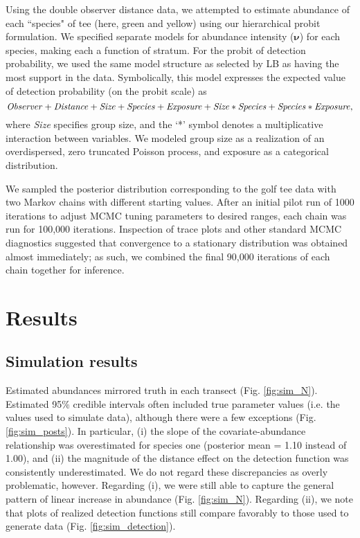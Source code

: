 \documentclass[10pt]{article}
\begin{document}
Using the double observer distance data, we attempted to estimate abundance of each ``species" of tee (here, green and yellow) using our hierarchical probit formulation.  We specified separate models for abundance intensity ($\boldsymbol{\nu}$) for each species, making each a function of stratum. For the probit of detection probability, we used the same model structure as selected by LB as having the most support in the data.  Symbolically, this model expresses the expected value of detection probability (on the probit scale) as
$$
{\it Observer+Distance+Size+Species+Exposure+Size*Species+Species*Exposure},
$$
where {\it Size} specifies group size, and the `*' symbol denotes a multiplicative interaction between variables.  We modeled group size as a realization of an overdispersed, zero truncated Poisson process, and exposure as a categorical distribution.

We sampled the posterior distribution corresponding to the golf tee data with two Markov chains with different starting values.  After an initial pilot run of 1000 iterations to adjust MCMC tuning parameters to desired ranges, each chain was run for 100,000 iterations.  Inspection of trace plots and other standard MCMC diagnostics suggested that convergence to a stationary distribution was obtained almost immediately; as such, we combined the final 90,000 iterations of each chain together for inference.


\section*{Results}

\subsection*{Simulation results}

Estimated abundances mirrored truth in each transect (Fig. \ref{fig:sim_N}).  Estimated 95\% credible intervals often included true parameter values (i.e. the values used to simulate data), although there were a few exceptions (Fig. \ref{fig:sim_posts}).  In particular, (i) the slope of the covariate-abundance relationship was overestimated for species one (posterior mean = 1.10 instead of 1.00), and (ii) the magnitude of the distance effect on the detection function was consistently underestimated.  We do not regard these discrepancies as overly problematic, however. Regarding (i), we were still able to capture the general pattern of linear increase in abundance (Fig. \ref{fig:sim_N}).  Regarding (ii), we note that plots of realized detection functions still compare favorably to those used to generate data (Fig. \ref{fig:sim_detection}).
\end{document}
